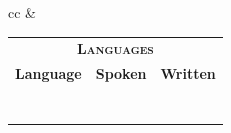 \documentclass[12pt]{g-brief}
\begin{document}
\begin{g-brief}


  
    
\begin{tabular}{cc}
     &

     \begin{minipage}[b]{.5\linewidth}
     \begin{tabular}[t]{|lll|}
\hline
\multicolumn{3}{|c|}{\scshape\textbf{Languages}}\Top{}\Bot{}\\
\textbf{Language} & \textbf{Spoken} & \textbf{Written}\Top{}\\
\hrulefill       & \srule{Spoken}  & \srule{Written}\\
\hrulefill       & \srule{Spoken}  & \srule{Written}\\
\hrulefill       & \srule{Spoken}  & \srule{Written}\\
\hrulefill       & \srule{Spoken}  & \srule{Written}\\
\hrulefill       & \srule{Spoken}  & \srule{Written}\\
\hrulefill       & \srule{Spoken}  & \srule{Written}\\
\hrulefill       & \srule{Spoken}  & \srule{Written}\Bot{}\\
\hline
\end{tabular}
    \end{minipage} 
\end{tabular}
\vspace*{-0.5cm}


\end{g-brief}
\end{document}
